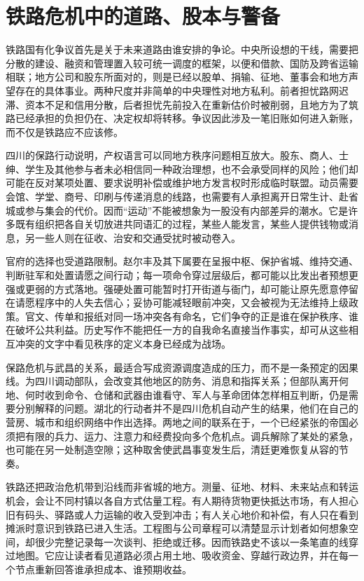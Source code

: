 \section{铁路危机中的道路、股本与警备}

铁路国有化争议首先是关于未来道路由谁安排的争论。中央所设想的干线，需要把分散的建设、融资和管理置入较可统一调度的框架，以便和借款、国防及跨省运输相联；地方公司和股东所面对的，则是已经以股单、捐输、征地、董事会和地方声望存在的具体事业。两种尺度并非简单的中央理性对地方私利。前者担忧路网迟滞、资本不足和信用分散，后者担忧先前投入在重新估价时被削弱，且地方为了筑路已经承担的负担仍在、决定权却将转移。争议因此涉及一笔旧账如何进入新账，而不仅是铁路应不应该修。

四川的保路行动说明，产权语言可以同地方秩序问题相互放大。股东、商人、士绅、学生及其他参与者未必相信同一种政治理想，也不会承受同样的风险；他们却可能在反对某项处置、要求说明补偿或维护地方发言权时形成临时联盟。动员需要会馆、学堂、商号、印刷与传递消息的线路，也需要有人承担离开日常生计、赴省城或参与集会的代价。因而“运动”不能被想象为一股没有内部差异的潮水。它是许多既有组织把各自关切放进共同语汇的过程，某些人能发言，某些人提供钱物或消息，另一些人则在征收、治安和交通受扰时被动卷入。

官府的选择也受道路限制。赵尔丰及其下属要在呈报中枢、保护省城、维持交通、判断驻军和处置请愿之间行动；每一项命令穿过层级后，都可能以比发出者预想更强或更弱的方式落地。强硬处置可能暂时打开街道与衙门，却可能让原先愿意停留在请愿程序中的人失去信心；妥协可能减轻眼前冲突，又会被视为无法维持上级政策。官文、传单和报纸对同一场冲突各有命名，它们争夺的正是谁在保护秩序、谁在破坏公共利益。历史写作不能把任一方的自我命名直接当作事实，却可从这些相互冲突的文字中看见秩序的定义本身已经成为战场。

保路危机与武昌的关系，最适合写成资源调度造成的压力，而不是一条预定的因果线。为四川调动部队，会改变其他地区的防务、消息和指挥关系；但部队离开何地、何时收到命令、仓储和武器由谁看守、军人与革命团体怎样相互判断，仍是需要分别解释的问题。湖北的行动者并不是四川危机自动产生的结果，他们在自己的营房、城市和组织网络中作出选择。两地之间的联系在于，一个已经紧张的帝国必须把有限的兵力、运力、注意力和经费投向多个危机点。调兵解除了某处的紧急，也可能在另一处制造空隙；这种取舍使武昌事变发生后，清廷更难恢复从容的节奏。

铁路还把政治危机带到沿线而非省城的地方。测量、征地、材料、未来站点和转运机会，会让不同村镇以各自方式估量工程。有人期待货物更快抵达市场，有人担心旧有码头、驿路或人力运输的收入受到冲击；有人关心地价和补偿，有人只在看到摊派时意识到铁路已进入生活。工程图与公司章程可以清楚显示计划者如何想象空间，却很少完整记录每一次谈判、拒绝或迁移。因而铁路史不该以一条笔直的线穿过地图。它应让读者看见道路必须占用土地、吸收资金、穿越行政边界，并在每一个节点重新回答谁承担成本、谁预期收益。

